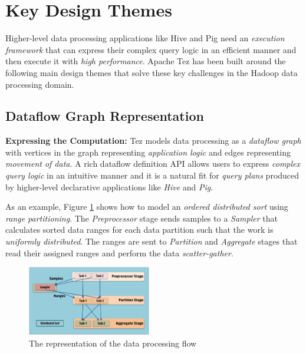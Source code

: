 \documentclass[twocolumn]{article}
\begin{document}
\section{Key Design Themes}

Higher-level data processing applications like Hive and Pig need an
\textit{execution framework} that can express their complex query logic in an
efficient manner and then execute it with \textit{high performance}. 
Apache Tez has been built around the following main design themes that solve these
key challenges in the Hadoop data processing domain.

\subsection{Dataflow Graph Representation}
\textbf{Expressing the Computation:} Tez models data processing as a \emph{dataflow graph} with vertices in
the graph representing \emph{application logic} and edges representing
\emph{movement of data}. A rich dataflow definition API allows users to
express \emph{complex query logic} in an intuitive manner and it is a
natural fit for \emph{query plans} produced by higher-level declarative
applications like \emph{Hive} and \emph{Pig}. 

As an example, Figure \ref{fig03} shows how to model an \emph{ordered distributed sort} using
\emph{range partitioning}. The \emph{Preprocessor} stage sends samples
to a \emph{Sampler} that calculates sorted data ranges for each data
partition such that the work is \emph{uniformly distributed}. The ranges
are sent to \emph{Partition} and \emph{Aggregate} stages that read
their assigned ranges and perform the data \emph{scatter-gather}. 

\begin{figure}[htb]
        \centering
        \includegraphics[width=0.48\textwidth]{tez1}
        \caption{The representation of the data processing flow}
        \label{fig03}
\end{figure}
\end{document}
